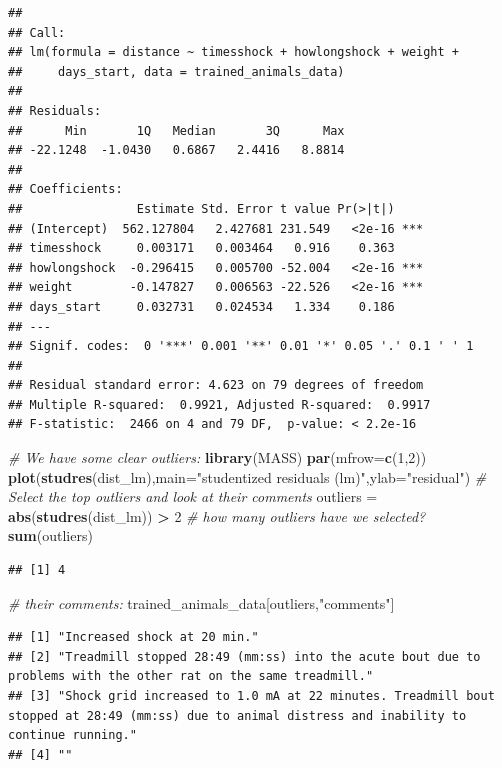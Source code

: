 \documentclass[]{article}
\newenvironment{Shaded}{\begin{snugshade}}{\end{snugshade}}
\newcommand{\KeywordTok}[1]{\textcolor[rgb]{0.13,0.29,0.53}{\textbf{#1}}}
\newcommand{\DataTypeTok}[1]{\textcolor[rgb]{0.13,0.29,0.53}{#1}}
\newcommand{\DecValTok}[1]{\textcolor[rgb]{0.00,0.00,0.81}{#1}}
\newcommand{\StringTok}[1]{\textcolor[rgb]{0.31,0.60,0.02}{#1}}
\newcommand{\CommentTok}[1]{\textcolor[rgb]{0.56,0.35,0.01}{\textit{#1}}}
\newcommand{\OperatorTok}[1]{\textcolor[rgb]{0.81,0.36,0.00}{\textbf{#1}}}
\newcommand{\NormalTok}[1]{#1}
\begin{document}
\begin{verbatim}
## 
## Call:
## lm(formula = distance ~ timesshock + howlongshock + weight + 
##     days_start, data = trained_animals_data)
## 
## Residuals:
##      Min       1Q   Median       3Q      Max 
## -22.1248  -1.0430   0.6867   2.4416   8.8814 
## 
## Coefficients:
##                Estimate Std. Error t value Pr(>|t|)    
## (Intercept)  562.127804   2.427681 231.549   <2e-16 ***
## timesshock     0.003171   0.003464   0.916    0.363    
## howlongshock  -0.296415   0.005700 -52.004   <2e-16 ***
## weight        -0.147827   0.006563 -22.526   <2e-16 ***
## days_start     0.032731   0.024534   1.334    0.186    
## ---
## Signif. codes:  0 '***' 0.001 '**' 0.01 '*' 0.05 '.' 0.1 ' ' 1
## 
## Residual standard error: 4.623 on 79 degrees of freedom
## Multiple R-squared:  0.9921, Adjusted R-squared:  0.9917 
## F-statistic:  2466 on 4 and 79 DF,  p-value: < 2.2e-16
\end{verbatim}

\begin{Shaded}
\begin{Highlighting}[]
\CommentTok{# We have some clear outliers:}
\KeywordTok{library}\NormalTok{(MASS)}
\KeywordTok{par}\NormalTok{(}\DataTypeTok{mfrow=}\KeywordTok{c}\NormalTok{(}\DecValTok{1}\NormalTok{,}\DecValTok{2}\NormalTok{))}
\KeywordTok{plot}\NormalTok{(}\KeywordTok{studres}\NormalTok{(dist_lm),}\DataTypeTok{main=}\StringTok{"studentized residuals (lm)"}\NormalTok{,}\DataTypeTok{ylab=}\StringTok{"residual"}\NormalTok{)}
\CommentTok{# Select the top outliers and look at their comments}
\NormalTok{outliers =}\StringTok{ }\KeywordTok{abs}\NormalTok{(}\KeywordTok{studres}\NormalTok{(dist_lm)) }\OperatorTok{>}\StringTok{ }\DecValTok{2}
\CommentTok{# how many outliers have we selected?}
\KeywordTok{sum}\NormalTok{(outliers)}
\end{Highlighting}
\end{Shaded}

\begin{verbatim}
## [1] 4
\end{verbatim}

\begin{Shaded}
\begin{Highlighting}[]
\CommentTok{# their comments:}
\NormalTok{trained_animals_data[outliers,}\StringTok{"comments"}\NormalTok{]}
\end{Highlighting}
\end{Shaded}

\begin{verbatim}
## [1] "Increased shock at 20 min."                                                                                                                     
## [2] "Treadmill stopped 28:49 (mm:ss) into the acute bout due to problems with the other rat on the same treadmill."                                  
## [3] "Shock grid increased to 1.0 mA at 22 minutes. Treadmill bout stopped at 28:49 (mm:ss) due to animal distress and inability to continue running."
## [4] ""
\end{verbatim}
\end{document}
